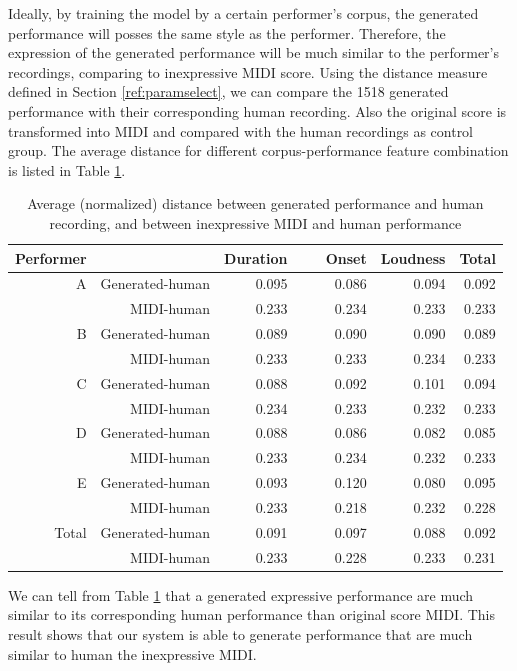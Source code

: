 Ideally, by training the model by a certain performer's corpus, the generated performance will posses the same style as the performer. Therefore, the expression of the generated performance will be much similar to the performer's recordings, comparing to inexpressive MIDI score. Using the distance measure defined in Section \ref{ref:paramselect}, we can compare the 1518 generated performance with their corresponding human recording. Also the original score is transformed into MIDI and compared with the human recordings as control group. The average distance for different corpus-performance feature combination is listed in Table \ref{tab:corr}.
\begin{table}
   \centering
   \caption{Average (normalized) distance between generated performance and human recording, and between inexpressive MIDI and human performance}
   \label{tab:corr}
   \begin{tabular}{rr|rrr|r}
\hline
Performer&&Duration&\ \ \ Onset&Loudness&Total\\
\hline
A&Generated-human&0.095&0.086&0.094&0.092\\
&MIDI-human&0.233&0.234&0.233&0.233\\
\hline
B&Generated-human&0.089&0.090&0.090&0.089\\
&MIDI-human&0.233&0.233&0.234&0.233\\
\hline
C&Generated-human&0.088&0.092&0.101&0.094\\
&MIDI-human&0.234&0.233&0.232&0.233\\
\hline
D&Generated-human&0.088&0.086&0.082&0.085\\
&MIDI-human&0.233&0.234&0.232&0.233\\
\hline
E&Generated-human&0.093&0.120&0.080&0.095\\
&MIDI-human&0.233&0.218&0.232&0.228\\
\hline
Total&Generated-human&0.091&0.097&0.088&0.092\\
&MIDI-human&0.233&0.228&0.233&0.231\\
\hline
   \end{tabular}
\end{table}

We can tell from Table \ref{tab:corr} that a generated expressive performance are much similar to its corresponding human performance than original score MIDI. This result shows that our system is able to generate performance that are much similar to human the inexpressive MIDI.

